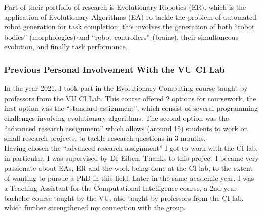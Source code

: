 \documentclass{scrartcl}
\begin{document}
Part of their portfolio of research is Evolutionary Robotics (ER), which is the application of Evolutionary Algorithms (EA) to tackle the problem of automated robot generation for task completion; this involves the generation of both ``robot bodies'' (morphologies) and ``robot controllers'' (brains), their simultaneous evolution, and finally task performance.

\subsubsection{Previous Personal Involvement With the VU CI Lab}

In the year 2021, I took part in the Evolutionary Computing course taught by professors from the VU CI Lab. This course offered 2 options for coursework, the first option was the ``standard assignment'', which consist of several programming challenges involving evolutionary algorithms. The second option was the ``advanced research assignment'' which allows (around 15) students to work on small research projects, to tackle research questions in 3 months. \\

Having chosen the ``advanced research assignment'' I got to work with the CI lab, in particular, I was supervised by Dr Eiben. Thanks to this project I became very passionate about EAs, ER and the work being done at the CI lab, to the extent of wanting to pursue a PhD in this field. 
Later in the same academic year, I was a Teaching Assistant for the Computational Intelligence course, a 2nd-year bachelor course taught by the VU, also taught by professors from the CI lab, which further strengthened my connection with the group.




\end{document}

